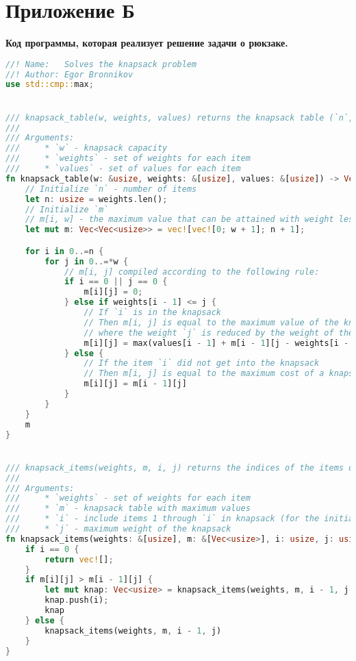 \section*{Приложение Б}
\label{sec:appendix2}

\begin{center}
    \textbf{Код программы, которая реализует решение задачи о рюкзаке.}
\end{center}

\begin{lstlisting}[language=Rust]
//! Name:   Solves the knapsack problem
//! Author: Egor Bronnikov
use std::cmp::max;


/// knapsack_table(w, weights, values) returns the knapsack table (`n`, `m`) with maximum values, where `n` is number of items
///
/// Arguments:
///     * `w` - knapsack capacity
///     * `weights` - set of weights for each item
///     * `values` - set of values for each item
fn knapsack_table(w: &usize, weights: &[usize], values: &[usize]) -> Vec<Vec<usize>> {
    // Initialize `n` - number of items
    let n: usize = weights.len();
    // Initialize `m`
    // m[i, w] - the maximum value that can be attained with weight less that or equal to `w` using items up to `i`
    let mut m: Vec<Vec<usize>> = vec![vec![0; w + 1]; n + 1];

    for i in 0..=n {
        for j in 0..=*w {
            // m[i, j] compiled according to the following rule:
            if i == 0 || j == 0 {
                m[i][j] = 0;
            } else if weights[i - 1] <= j {
                // If `i` is in the knapsack
                // Then m[i, j] is equal to the maximum value of the knapsack,
                // where the weight `j` is reduced by the weight of the `i-th` item and the set of admissible items plus the value `k`
                m[i][j] = max(values[i - 1] + m[i - 1][j - weights[i - 1]], m[i - 1][j]);
            } else {
                // If the item `i` did not get into the knapsack
                // Then m[i, j] is equal to the maximum cost of a knapsack with the same capacity and a set of admissible items
                m[i][j] = m[i - 1][j]
            }
        }
    }
    m
}


/// knapsack_items(weights, m, i, j) returns the indices of the items of the optimal knapsack (from 1 to `n`)
///
/// Arguments:
///     * `weights` - set of weights for each item
///     * `m` - knapsack table with maximum values
///     * `i` - include items 1 through `i` in knapsack (for the initial value, use `n`)
///     * `j` - maximum weight of the knapsack
fn knapsack_items(weights: &[usize], m: &[Vec<usize>], i: usize, j: usize) -> Vec<usize> {
    if i == 0 {
        return vec![];
    }
    if m[i][j] > m[i - 1][j] {
        let mut knap: Vec<usize> = knapsack_items(weights, m, i - 1, j - weights[i - 1]);
        knap.push(i);
        knap
    } else {
        knapsack_items(weights, m, i - 1, j)
    }
}



\end{lstlisting}
